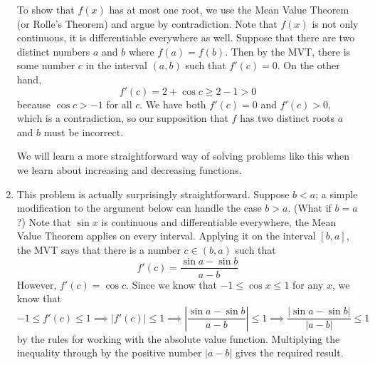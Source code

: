 \documentclass{article}
\begin{document}
\begin{enumerate}
  To show that $f(x)$ has at most one root, we use the Mean Value Theorem
  (or Rolle's Theorem)
  and argue by contradiction.  Note that $f(x)$ is not only continuous, it 
  is differentiable everywhere as well.  Suppose that there are two 
  distinct numbers
  $a$ and $b$ where $f(a)=f(b)$.  Then by the MVT, there is some number $c$ in
  the interval $(a,b)$ such that $f'(c)=0$.  On the other hand,
  \begin{equation*}
    f'(c) = 2 + \cos c \ge 2 - 1 > 0
  \end{equation*}
  because $\cos c>-1$ for all $c$.  We have both $f'(c)=0$ and $f'(c)>0$,
  which is a contradiction, so our supposition that $f$ has two distinct roots
  $a$ and $b$ must be incorrect.

  We will learn a more straightforward way of solving problems like this when
  we learn about increasing and decreasing functions.
\item %
  This problem is actually surprisingly straightforward.  Suppose
  $b<a$; a simple modification to the argument below can handle the
  case $b>a$.  (What if $b=a$?)  Note that $\sin x$ is continuous and
  differentiable everywhere, the Mean Value Theorem applies on every
  interval.  Applying it on the interval $[b,a]$, the MVT says that
  there is a number $c\in(b,a)$ such that
  \begin{equation*}
    f'(c) = \frac{\sin a-\sin b}{a-b}
  \end{equation*}
  However, $f'(c)=\cos c$.  Since we know that $-1\le \cos x\le 1$ for any
  $x$, we know that 
  \begin{equation*}
    -1 \le f'(c) \le 1 \implies |f'(c)|\le 1
    \implies \left|\frac{\sin a - \sin b}{a-b}\right| \le 1
    \implies \frac{|\sin a - \sin b|}{|a-b|} \le 1
  \end{equation*}
  by the rules for working with the absolute value function.  Multiplying
  the inequality through by the positive number $|a-b|$ gives the required
  result.
\end{enumerate}
\end{document}
